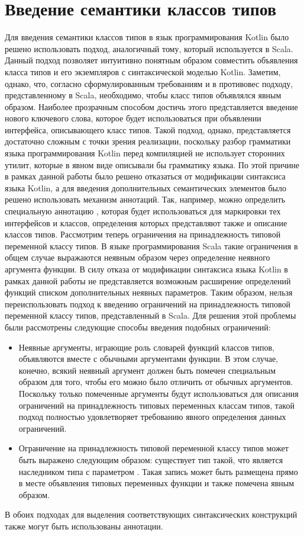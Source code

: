 \section{Введение семантики классов типов}

Для введения семантики классов типов в язык программирования Kotlin было решено использовать подход, аналогичный тому, который используется в Scala. Данный подход позволяет интуитивно понятным образом совместить объявления класса типов и его экземпляров с синтаксической моделью Kotlin. Заметим, однако, что, согласно сформулированным требованиям и в противовес подходу, представленному в Scala, необходимо, чтобы класс типов объявлялся явным образом. Наиболее прозрачным способом достичь этого представляется введение нового ключевого слова, которое будет использоваться при объявлении интерфейса, описывающего класс типов. Такой подход, однако, представляется достаточно сложным с точки зрения реализации, поскольку разбор грамматики языка программирования Kotlin перед компиляцией не использует сторонних утилит, которые в явном виде описывали бы грамматику языка. По этой причине в рамках данной работы было решено отказаться от модификации синтаксиса языка Kotlin, а для введения дополнительных семантических элементов было решено использовать механизм аннотаций. Так, например, можно определить специальную аннотацию , которая будет использоваться для маркировки тех интерфейсов и классов, определения которых представляют также и описание классов типов. Рассмотрим теперь ограничения на принадлежность типовой переменной классу типов. В языке программирования Scala такие ограничения в общем случае выражаются неявным образом через определение неявного аргумента функции. В силу отказа от модификации синтаксиса языка Kotlin в рамках данной работы не представляется возможным расширение определений функций списком дополнительных неявных параметров. Таким образом, нельзя переиспользовать подход к введению ограничений на принадлежность типовой переменной классу типов, представленный в Scala. Для решения этой проблемы были рассмотрены следующие способы введения подобных ограничений:
\begin{itemize}
    \item Неявные аргументы, играющие роль словарей функций классов типов, объявляются вместе с обычными аргументами функции. В этом случае, конечно, всякий неявный аргумент должен быть помечен специальным образом для того, чтобы его можно было отличить от обычных аргументов. Поскольку только помеченные аргументы будут использоваться для описания ограничений на принадлежность типовых переменных классам типов, такой подход полностью удовлетворяет требованию явного определения данных ограничений.  
    \item Ограничение на принадлежность типовой переменной  классу типов  может быть выражено следующим образом: существует тип  такой, что  является наследником типа  с параметром . Такая запись может быть размещена прямо в месте объявления типовых переменных функции и также помечена явным образом.
\end{itemize}
В обоих подходах для выделения соответствующих синтаксических конструкций также могут быть использованы аннотации. 

